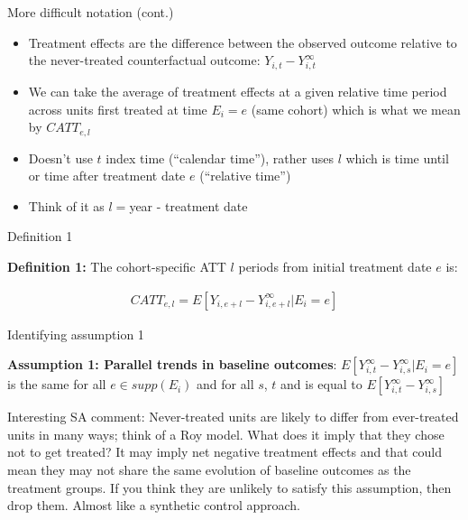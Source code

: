 \documentclass{beamer}
\begin{document}
\begin{frame}{More difficult notation (cont.)}

\begin{itemize}
\item Treatment effects are the difference between the observed outcome relative to the never-treated counterfactual outcome: $Y_{i,t} - Y^{\infty}_{i,t}$
\item We can take the average of treatment effects at a given relative time period across units first treated at time $E_i=e$ (same cohort) which is what we mean by $CATT_{e,l}$
\item Doesn't use $t$ index time (``calendar time''), rather uses $l$ which is time until or time after treatment date $e$ (``relative time'')
\item Think of it as ${l}=$year - treatment date
\end{itemize}

\end{frame}

\begin{frame}{Definition 1}

\textbf{Definition 1:} The cohort-specific ATT $l$ periods from initial treatment date $e$ is:

\begin{eqnarray*}
CATT_{e,l} = E[Y_{i,e+l} - Y^{\infty}_{i,e+l} | E_i=e]
\end{eqnarray*}

\end{frame}


\begin{frame}{Identifying assumption 1}

\textbf{Assumption 1: Parallel trends in baseline outcomes}: $E[Y^{\infty}_{i,t} - Y^{\infty}_{i,s} | E_i = e ]$ is the same for all $e \in supp(E_i)$ and for all $s$, $t$ and is equal to $E[Y^{\infty}_{i,t} - Y^{\infty}_{i,s} ]$

\bigskip

Interesting SA comment: Never-treated units are likely to differ from ever-treated units in many ways; think of a Roy model.  What does it imply that they chose not to get treated? It may imply net negative treatment effects and that could mean they may not share the same evolution of baseline outcomes as the treatment groups. If you think they are unlikely to satisfy this assumption, then drop them.  Almost like a synthetic control approach.

\end{frame}
\end{document}
